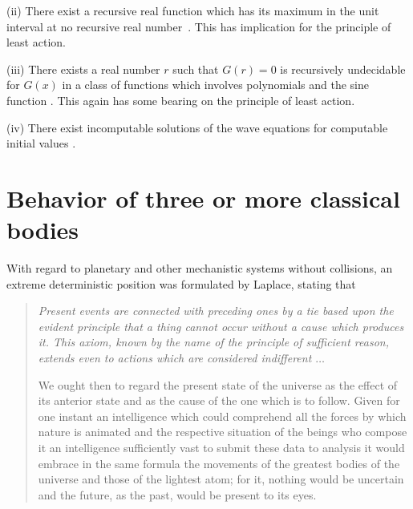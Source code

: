 \documentclass[rmp,amsfonts,showpacs,showkeys,twocolumn]{revtex4}
\begin{document}
(ii)
There exist a recursive real function which has its maximum in the unit interval
at no recursive real number~\cite{Specker57}.
This has implication for the principle of least action.

(iii)
There exists a real number $r$ such that $G(r) = 0$ is recursively undecidable for $G(x)$
in a class of functions which involves polynomials and the sine function
\cite{wang}.
This again has some bearing on  the principle of least action.

(iv)
There exist incomputable solutions of the wave equations for computable initial values
\cite{pr1,bridges1}.




\section{Behavior of three or more classical bodies}

With regard to planetary and other mechanistic systems without collisions,
an extreme deterministic position
was formulated by Laplace,  stating that~\cite[Chapter II]{laplace-prob}
\begin{quote}
{\em
Present events are connected with preceding ones
by a tie based upon the evident principle that a thing
cannot occur without a cause which produces it. This
axiom, known by the name of the principle of sufficient
reason, extends even to actions which are considered
indifferent $\ldots$


We ought then to regard the present state of the
universe as the effect of its anterior state and as the
cause of the one which is to follow. Given for one
instant an intelligence which could comprehend all the
forces by which nature is animated and the respective
situation of the beings who compose it an intelligence
sufficiently vast to submit these data to analysis it
would embrace in the same formula the movements of
the greatest bodies of the universe and those of the
lightest atom; for it, nothing would be uncertain and
the future, as the past, would be present to its eyes.
}
\end{quote}
\end{document}
